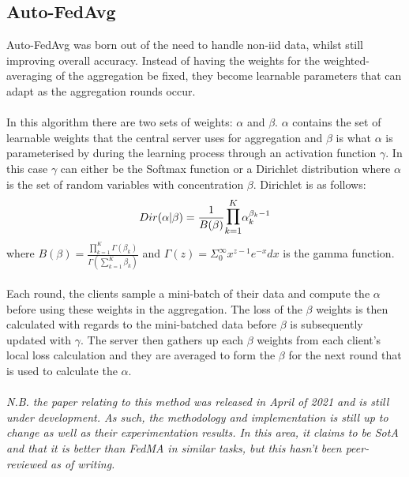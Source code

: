 \subsection{Auto-FedAvg}
Auto-FedAvg \cite{autofa} was born out of the need to handle non-iid data, whilst still improving overall accuracy.
Instead of having the weights for the weighted-averaging of the aggregation be fixed, they become learnable parameters that can adapt as the aggregation rounds occur.
\\ \\
In this algorithm there are two sets of weights: $\alpha$ and $\beta$.
$\alpha$ contains the set of learnable weights that the central server uses for aggregation and $\beta$ is what $\alpha$ is parameterised by during the learning process through an activation function $\gamma$.
In this case $\gamma$ can either be the Softmax function or a Dirichlet distribution where $\alpha$ is the set of random variables with concentration $\beta$. 
Dirichlet is as follows:
\begin{equation}
    Dir(\alpha | \beta) = \dfrac{1}{B(\beta)} \mathlarger{\mathlarger{\prod}}_{k=1}^{K} \alpha_k^{\beta_k-1}
\end{equation}
where $B(\beta) = \frac{\prod_{k=1}^K \Gamma(\beta_k)}{\Gamma (\sum_{k=1}^K \beta_k)}$ and $\Gamma(z) = \Sigma_0^\infty x^{z-1} e^{-x} dx$ is the gamma function.
\\ \\
Each round, the clients sample a mini-batch of their data and compute the $\alpha$ before using these weights in the aggregation.
The loss of the $\beta$ weights is then calculated with regards to the mini-batched data before $\beta$ is subsequently updated with $\gamma$.
The server then gathers up each $\beta$ weights from each client's local loss calculation and they are averaged to form the $\beta$ for the next round that is used to calculate the $\alpha$.
\\ \\
\textit{N.B. the paper relating to this method \cite{autofa} was released in April of 2021 and is still under development. As such, the methodology and implementation is still up to change as well as their experimentation results. In this area, it claims to be SotA and that it is better than FedMA in similar tasks, but this hasn't been peer-reviewed as of writing.}